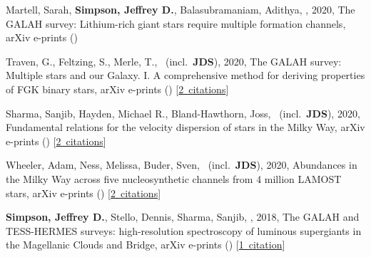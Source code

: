 \item[{\color{numcolor}\scriptsize5}] Martell, Sarah, \textbf{Simpson, Jeffrey D.}, Balasubramaniam, Adithya, \etal, 2020, The GALAH survey: Lithium-rich giant stars require multiple formation channels, arXiv e-prints ()

\item[{\color{numcolor}\scriptsize4}] Traven, G., Feltzing, S., Merle, T., \etal\ (incl.\ \textbf{JDS}), 2020, The GALAH survey: Multiple stars and our Galaxy. I. A comprehensive method for deriving properties of FGK binary stars, arXiv e-prints () [\href{https://ui.adsabs.harvard.edu/#abs/2020arXiv200500014T}{2~citations}]

\item[{\color{numcolor}\scriptsize3}] Sharma, Sanjib, Hayden, Michael R., Bland-Hawthorn, Joss, \etal\ (incl.\ \textbf{JDS}), 2020, Fundamental relations for the velocity dispersion of stars in the Milky Way, arXiv e-prints () [\href{https://ui.adsabs.harvard.edu/#abs/2020arXiv200406556S}{2~citations}]

\item[{\color{numcolor}\scriptsize2}] Wheeler, Adam, Ness, Melissa, Buder, Sven, \etal\ (incl.\ \textbf{JDS}), 2020, Abundances in the Milky Way across five nucleosynthetic channels from 4 million LAMOST stars, arXiv e-prints () [\href{https://ui.adsabs.harvard.edu/#abs/2020arXiv200108227W}{2~citations}]

\item[{\color{numcolor}\scriptsize1}] \textbf{Simpson, Jeffrey D.}, Stello, Dennis, Sharma, Sanjib, \etal, 2018, The GALAH and TESS-HERMES surveys: high-resolution spectroscopy of luminous supergiants in the Magellanic Clouds and Bridge, arXiv e-prints () [\href{https://ui.adsabs.harvard.edu/#abs/2018arXiv180405900S}{1~citation}]